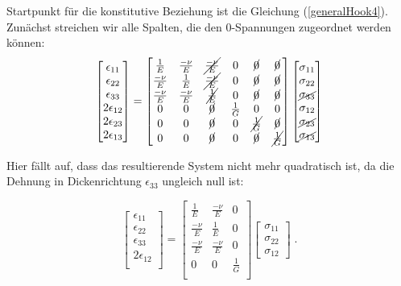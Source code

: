 Startpunkt für die konstitutive Beziehung ist die Gleichung (\ref{generalHook4}). Zunächst streichen wir alle Spalten, die den 0-Spannungen zugeordnet werden können:
\begin{equation}
\label{generalHookESZ1}
\begin{bmatrix} 
\epsilon_{11} \\
\epsilon_{22} \\
\epsilon_{33} \\
2\epsilon_{12} \\
2\epsilon_{23} \\
2\epsilon_{13} 
\end{bmatrix} = \begin{bmatrix}
\frac{1}{E} & \frac{-\nu}{E} & \cancel{\frac{-\nu}{E}} & 0 & \cancel{0} & \cancel{0} \\
\frac{-\nu}{E} & \frac{1}{E} & \cancel{\frac{-\nu}{E}} & 0 & \cancel{0} & \cancel{0} \\
{\frac{-\nu}{E}} & {\frac{-\nu}{E}} & \cancel{\frac{1}{E}} & {0} & \cancel{0} & \cancel{0} \\
0 & 0 & \cancel{0} & \frac{1}{G} & 0 & 0 \\
{0} & {0} & \cancel{0} & {0} & \cancel{\frac{1}{G}} & \cancel{0} \\
{0} & {0} & \cancel{0} & {0} & \cancel{0} & \cancel{\frac{1}{G}} \\ 
\end{bmatrix} \begin{bmatrix} \sigma_{11} \\ \sigma_{22} \\ \cancel{\sigma_{33}} \\ \sigma_{12} \\ \cancel{\sigma_{23}} \\ \cancel{\sigma_{13}} \end{bmatrix}
\end{equation}

Hier fällt auf, dass das resultierende System nicht mehr quadratisch ist, da die Dehnung in Dickenrichtung $\epsilon_{33}$ ungleich null ist:

\begin{equation}
\label{generalHookESZ2}
\begin{bmatrix} 
\epsilon_{11} \\
\epsilon_{22} \\
\epsilon_{33} \\
2\epsilon_{12} \\
\end{bmatrix} = \begin{bmatrix}
\frac{1}{E} & \frac{-\nu}{E}  & 0  \\
\frac{-\nu}{E} & \frac{1}{E}  & 0  \\
{\frac{-\nu}{E}} & {\frac{-\nu}{E}} & {0} \\
0 & 0 & \frac{1}{G}  \\
\end{bmatrix} \begin{bmatrix} \sigma_{11} \\ \sigma_{22} \\ \sigma_{12} \end{bmatrix} \; .
\end{equation}

